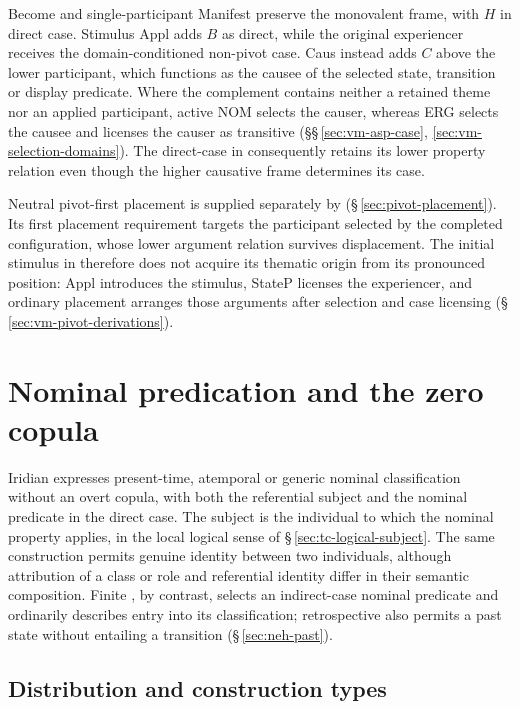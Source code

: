 Become and single-participant Manifest preserve the monovalent frame, with
$H$ in direct case. Stimulus Appl adds $B$ as direct, while the original
experiencer receives the domain-conditioned non-pivot case. Caus instead
adds $C$ above the lower participant, which functions as the causee of the
selected state, transition or display predicate. Where the complement
contains neither a retained theme nor an applied participant, active NOM
selects the causer, whereas ERG selects the causee and licenses the causer
as transitive (\S\S\,\ref{sec:vm-asp-case},
\ref{sec:vm-selection-domains}). The direct-case  in
 consequently retains its lower property
relation even though the higher causative frame determines its case.

Neutral pivot-first placement is supplied separately by 
(\S\,\ref{sec:pivot-placement}). Its first placement requirement targets
the participant selected by the completed configuration, whose lower
argument relation survives displacement. The initial stimulus in
 therefore does not acquire its thematic
origin from its pronounced position: Appl introduces the stimulus,
StateP licenses the experiencer, and ordinary placement arranges those
arguments after selection and case licensing
(\S\,\ref{sec:vm-pivot-derivations}).

\section{Nominal predication and the zero copula}%
\label{sec:copula}\label{sec:zero-copula}

Iridian expresses present-time, atemporal or generic nominal classification
without an overt copula, with both the referential subject and the nominal predicate
in the direct case. The subject is the individual to which the nominal
property applies, in the local logical sense of
§\,\ref{sec:tc-logical-subject}. The same construction permits genuine
identity between two individuals, although attribution of a class or role
and referential identity differ in their semantic composition. Finite , by
contrast, selects an indirect-case nominal predicate and ordinarily describes
entry into its classification; retrospective  also permits a past
state without entailing a transition (§\,\ref{sec:neh-past}).

\subsection{Distribution and construction types}

